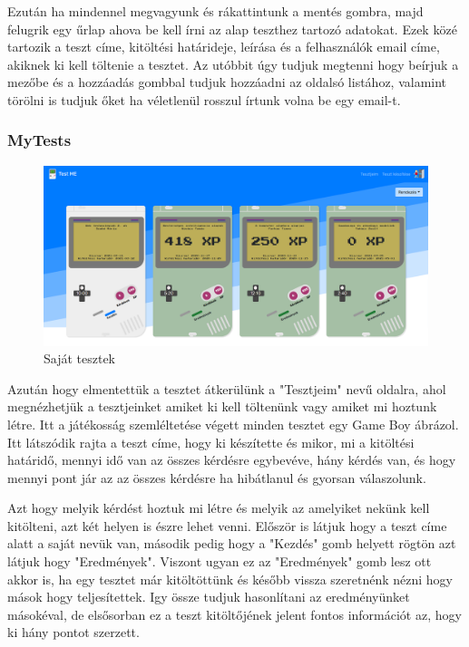 Ezután ha mindennel megvagyunk és rákattintunk a mentés gombra, majd felugrik egy űrlap ahova be kell írni az alap teszthez tartozó adatokat. Ezek közé tartozik a teszt címe, kitöltési határideje, leírása és a felhasználók email címe, akiknek ki kell töltenie a tesztet. Az utóbbit úgy tudjuk megtenni hogy beírjuk a mezőbe és a hozzáadás gombbal tudjuk hozzáadni az oldalsó listához, valamint törölni is tudjuk őket ha véletlenül rosszul írtunk volna be egy email-t.

\subsubsection{MyTests}


\begin{figure}[H]
    \centering
    \includegraphics[width=\linewidth]{images/my_tests.png}
    \caption{Saját tesztek}
\end{figure}

Azután hogy elmentettük a tesztet átkerülünk a "Tesztjeim" nevű oldalra, ahol megnézhetjük a tesztjeinket amiket ki kell töltenünk vagy amiket mi hoztunk létre. Itt a játékosság szemléltetése végett minden tesztet egy Game Boy ábrázol. Itt látszódik rajta a teszt címe, hogy ki készítette és mikor, mi a kitöltési határidő, mennyi idő van az összes kérdésre egybevéve, hány kérdés van, és hogy mennyi pont jár az az összes kérdésre ha hibátlanul és gyorsan válaszolunk.

Azt hogy melyik kérdést hoztuk mi létre és melyik az amelyiket nekünk kell kitölteni, azt két helyen is észre lehet venni. Először is látjuk hogy a teszt címe alatt a saját nevük van, második pedig hogy a "Kezdés" gomb helyett rögtön azt látjuk hogy "Eredmények". Viszont ugyan ez az "Eredmények" gomb lesz ott akkor is, ha egy tesztet már kitöltöttünk és később vissza szeretnénk nézni hogy mások hogy teljesítettek. Igy össze tudjuk hasonlítani az eredményünket másokéval, de elsősorban ez a teszt kitöltőjének jelent fontos információt az, hogy ki hány pontot szerzett.


